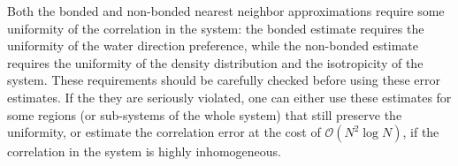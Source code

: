 \documentclass[journal=jacsat,manuscript=article]{achemso}
\renewcommand{\v}[1]{\textbf{\textit{#1}}}
\renewcommand{\d}[1]{\textsf{#1}}
\begin{document}
{  Both the bonded and non-bonded nearest neighbor approximations
  require some uniformity of the correlation in the system:
  the bonded estimate requires the uniformity of the water
  direction preference, while the non-bonded estimate requires the uniformity
  of the density distribution and the isotropicity of the system.
  These requirements should be carefully checked before using
  these error estimates.
  If the they are seriously violated,
  one can either use these estimates for 
  some regions (or sub-systems of the whole system) that
  still preserve the uniformity,
  or estimate the correlation error at the cost of
  $\mathcal O(N^2\log N)$, if the correlation in the system is highly
  inhomogeneous.  
  
}
\end{document}
